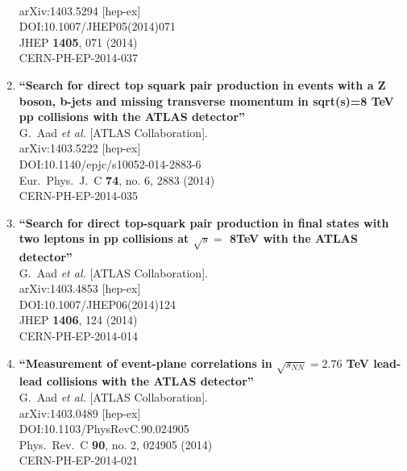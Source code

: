 \documentclass{article}
\begin{document}
\begin{enumerate}
  \\{}arXiv:1403.5294 [hep-ex]
  \\{}DOI:10.1007/JHEP05(2014)071
  \\{}JHEP {\bf 1405}, 071 (2014)
  \\{}CERN-PH-EP-2014-037
\item%
{\bf ``Search for direct top squark pair production in events with a Z boson, b-jets and missing transverse momentum in sqrt(s)=8 TeV pp collisions with the ATLAS detector''}
  \\{}G.~Aad {\it et al.} [ATLAS Collaboration].
  \\{}arXiv:1403.5222 [hep-ex]
  \\{}DOI:10.1140/epjc/s10052-014-2883-6
  \\{}Eur.\ Phys.\ J.\ C {\bf 74}, no. 6, 2883 (2014)
  \\{}CERN-PH-EP-2014-035
\item%
{\bf ``Search for direct top-squark pair production in final states with two leptons in pp collisions at $\sqrt{s} =$ 8TeV with the ATLAS detector''}
  \\{}G.~Aad {\it et al.} [ATLAS Collaboration].
  \\{}arXiv:1403.4853 [hep-ex]
  \\{}DOI:10.1007/JHEP06(2014)124
  \\{}JHEP {\bf 1406}, 124 (2014)
  \\{}CERN-PH-EP-2014-014
\item%
{\bf ``Measurement of event-plane correlations in $\sqrt{s_{NN}}=2.76$ TeV lead-lead collisions with the ATLAS detector''}
  \\{}G.~Aad {\it et al.} [ATLAS Collaboration].
  \\{}arXiv:1403.0489 [hep-ex]
  \\{}DOI:10.1103/PhysRevC.90.024905
  \\{}Phys.\ Rev.\ C {\bf 90}, no. 2, 024905 (2014)
  \\{}CERN-PH-EP-2014-021

\end{enumerate}
\end{document}
